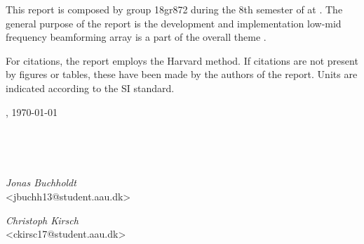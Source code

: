 This report is composed by group 18gr872 during the 8th semester of \projectFaculty{} at \AAU{}. The general purpose of the report is the development and implementation low-mid frequency beamforming array is a part of the overall theme \textit{\projectTheme}. 

For citations, the report employs the Harvard method. If citations are not present by figures or tables, these have been made by the authors of the report. Units are indicated according to the SI standard.



\vspace{\baselineskip}\hfill \AAU, \today
\vfill\noindent
\begin{center}
\begin{minipage}[b]{0.45\textwidth}
 \centering
  \textit{}\\
 {}
\end{minipage}
\hspace{0.3cm}
\begin{minipage}[b]{0.45\textwidth}
 \centering
  \textit{}\\
 {}
\end{minipage}
\end{center}
\vspace{1\baselineskip}
\begin{center}
\begin{minipage}[b]{0.45\textwidth}
 \centering
  \textit{Jonas Buchholdt}\\
 {\footnotesize <jbuchh13@student.aau.dk>}
\end{minipage}
\hspace{0.3cm}
\begin{minipage}[b]{0.45\textwidth}
 \centering
  \textit{Christoph Kirsch}\\
 {\footnotesize <ckirsc17@student.aau.dk>}
\end{minipage}
\end{center}

